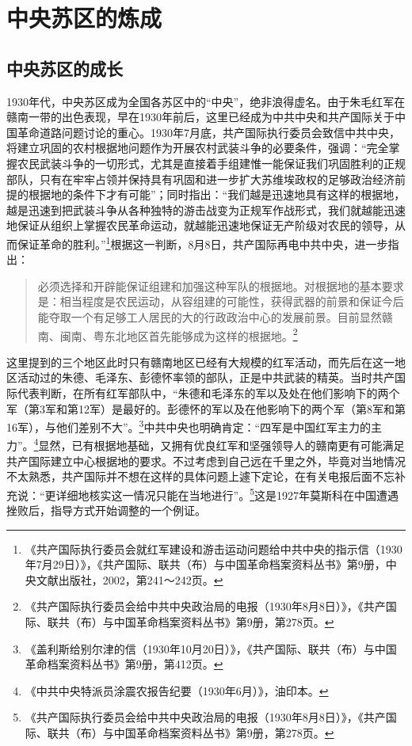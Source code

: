 \chapter{中央苏区的炼成}

\section{中央苏区的成长}


1930年代，中央苏区成为全国各苏区中的“中央”，绝非浪得虚名。由于朱毛红军在赣南一带的出色表现，早在1930年前后，这里已经成为中共中央和共产国际关于中国革命道路问题讨论的重心。1930年7月底，共产国际执行委员会致信中共中央，将建立巩固的农村根据地问题作为开展农村武装斗争的必要条件，强调：“完全掌握农民武装斗争的一切形式，尤其是直接着手组建惟一能保证我们巩固胜利的正规部队，只有在牢牢占领并保持具有巩固和进一步扩大苏维埃政权的足够政治经济前提的根据地的条件下才有可能”；同时指出：“我们越是迅速地具有这样的根据地，越是迅速到把武装斗争从各种独特的游击战变为正规军作战形式，我们就越能迅速地保证从组织上掌握农民革命运动，就越能迅速地保证无产阶级对农民的领导，从而保证革命的胜利。”\footnote{《共产国际执行委员会就红军建设和游击运动问题给中共中央的指示信（1930年7月29日）》，《共产国际、联共（布）与中国革命档案资料丛书》第9册，中央文献出版社，2002，第241～242页。}根据这一判断，8月8日，共产国际再电中共中央，进一步指出：

\begin{quote}

必须选择和开辟能保证组建和加强这种军队的根据地。对根据地的基本要求是：相当程度是农民运动，从容组建的可能性，获得武器的前景和保证今后能夺取一个有足够工人居民的大的行政政治中心的发展前景。目前显然赣南、闽南、粤东北地区首先能够成为这样的根据地。\footnote{《共产国际执行委员会给中共中央政治局的电报（1930年8月8日）》，《共产国际、联共（布）与中国革命档案资料丛书》第9册，第278页。}
\end{quote}


这里提到的三个地区此时只有赣南地区已经有大规模的红军活动，而先后在这一地区活动过的朱德、毛泽东、彭德怀率领的部队，正是中共武装的精英。当时共产国际代表判断，在所有红军部队中，“朱德和毛泽东的军以及处在他们影响下的两个军（第3军和第12军）是最好的。彭德怀的军以及在他影响下的两个军（第8军和第16军），与他们差别不大”。\footnote{《盖利斯给别尔津的信（1930年10月20日）》，《共产国际、联共（布）与中国革命档案资料丛书》第9册，第412页。}中共中央也明确肯定：“四军是中国红军主力的主力”。\footnote{《中共中央特派员涂震农报告纪要（1930年6月）》，油印本。}显然，已有根据地基础，又拥有优良红军和坚强领导人的赣南更有可能满足共产国际建立中心根据地的要求。不过考虑到自己远在千里之外，毕竟对当地情况不太熟悉，共产国际并不想在这样的具体问题上遽下定论，在有关电报后面不忘补充说：“更详细地核实这一情况只能在当地进行”。\footnote{《共产国际执行委员会给中共中央政治局的电报（1930年8月8日）》，《共产国际、联共（布）与中国革命档案资料丛书》第9册，第278页。}这是1927年莫斯科在中国遭遇挫败后，指导方式开始调整的一个例证。


